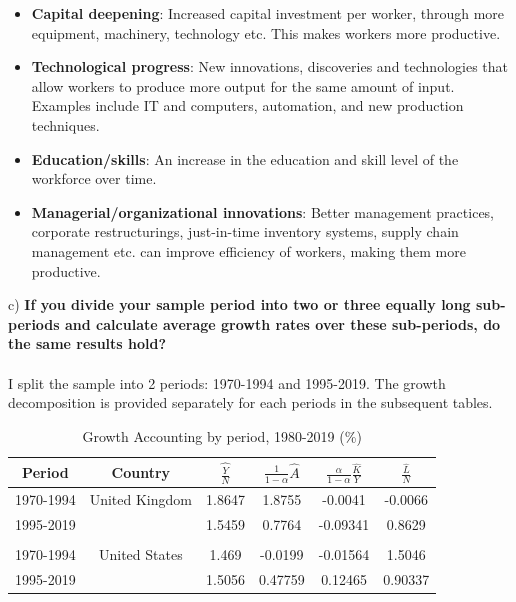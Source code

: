 \documentclass[11pt]{article}
\theoremstyle{mytheoremstyle}
\theoremstyle{mytheoremstyle}
\theoremstyle{myproblemstyle}
\begin{document}
\begin{itemize}
\item \textbf{Capital deepening}: Increased capital investment per worker, through more equipment, machinery, technology etc. This makes workers more productive.
\item \textbf{Technological progress}: New innovations, discoveries and technologies that allow workers to produce more output for the same amount of input. Examples include IT and computers, automation, and new production techniques.
\item \textbf{Education/skills}: An increase in the education and skill level of the workforce over time.
\item \textbf{Managerial/organizational innovations}: Better management practices, corporate restructurings, just-in-time inventory systems, supply chain management etc. can improve efficiency of workers, making them more productive.
\end{itemize}

\noindent c) \textbf{If you divide your sample period into two or three equally long sub-periods and calculate average growth rates over these sub-periods, do the same results hold?}
\\ \\ 
I split the sample into 2 periods: 1970-1994 and 1995-2019. The growth decomposition is provided separately for each periods in the subsequent tables.

\begin{table}[htbp]
    \centering
    \caption{Growth Accounting by period, 1980-2019 (\%)}
    \label{tab:growth-accounting_period}
    \begin{tabular}{@{}cccccc@{}}
    \toprule
    Period & Country & $\widehat{\frac{Y}{N}}$ & $\frac{1}{1-\alpha} \widehat{A}$ & $\frac{\alpha}{1-\alpha} \frac{\widehat{K}}{Y}$ & $\frac{\widehat{L}}{N}$ \\ \midrule
    1970-1994 & United Kingdom &  1.8647 & 1.8755  & -0.0041 & -0.0066  \\
    1995-2019 &  & 1.5459 & 0.7764 & -0.09341 & 0.8629 \\
    \\
    1970-1994 & United States & 1.469 & -0.0199 & -0.01564 & 1.5046 \\
    1995-2019 &  & 1.5056 & 0.47759 & 0.12465 & 0.90337  \\ \bottomrule
    \end{tabular}
    \end{table}
\end{document}
